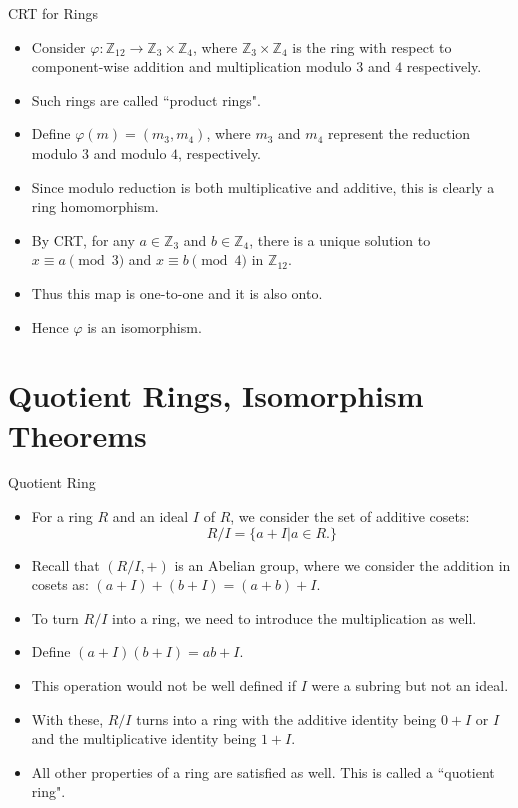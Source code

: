 \documentclass[ %
 10pt, xcolor={dvipsnames,svgnames,x11names,hyperref},
   hyperref={colorlinks=true,citecolor=green,linkcolor=DarkRed,urlcolor=ProcessBlue,anchorcolor=blue}
  ]{beamer}
\newenvironment{stepitemize}{\begin{itemize}[<+->]}{\end{itemize} }
\newcommand{\Z}{\mathbb{Z}}
\begin{document}
\begin{frame}{CRT for Rings}
\begin{stepitemize}
\item Consider $\varphi:\Z_{12}\rightarrow \Z_{3}\times \Z_{4}$, where $\Z_3\times \Z_4$ is the ring with respect to component-wise addition and multiplication modulo $3$ and $4$ respectively.
\item Such rings are called ``product rings".
\item Define $\varphi(m) = (m_3, m_4)$, where $m_3$ and $m_4$ represent the reduction modulo $3$ and modulo $4$, respectively. 
\item Since modulo reduction is both multiplicative and additive, this is clearly a ring homomorphism. 
\item By CRT, for any $a \in \Z_3$ and $b\in \Z_4$, there is a unique solution to  $x\equiv a \pmod{3}$ and $x\equiv b\pmod{4}$ in $\Z_{12}$. 
\item Thus this map is one-to-one and it is also onto. 
\item Hence $\varphi$ is an isomorphism.
\end{stepitemize}
\end{frame}

\section{Quotient Rings, Isomorphism Theorems}

\begin{frame}{Quotient Ring}
\begin{stepitemize}
    \item For a ring $R$ and an ideal $I$ of $R$, we consider the set of additive cosets:
$$R/I = \{a+I|a\in R.\}$$
\item Recall that $(R/I,+)$ is an Abelian group, where we consider the addition in cosets as: $(a+I)+(b+I) = (a+b)+I$. 
\item To turn $R/I$ into a ring, we need to introduce the multiplication as well. 
\item Define $(a+I)(b+I)=ab+I$.
\item This operation would not be well defined if $I$ were a subring but not an ideal. 
\item With these, $R/I$ turns into a ring with the additive identity being $0+I$ or $I$ and the multiplicative identity being $1+I$. 
\item All other properties of a ring are satisfied as well. This is called a ``quotient ring". 
\end{stepitemize}
\end{frame}
\end{document}
